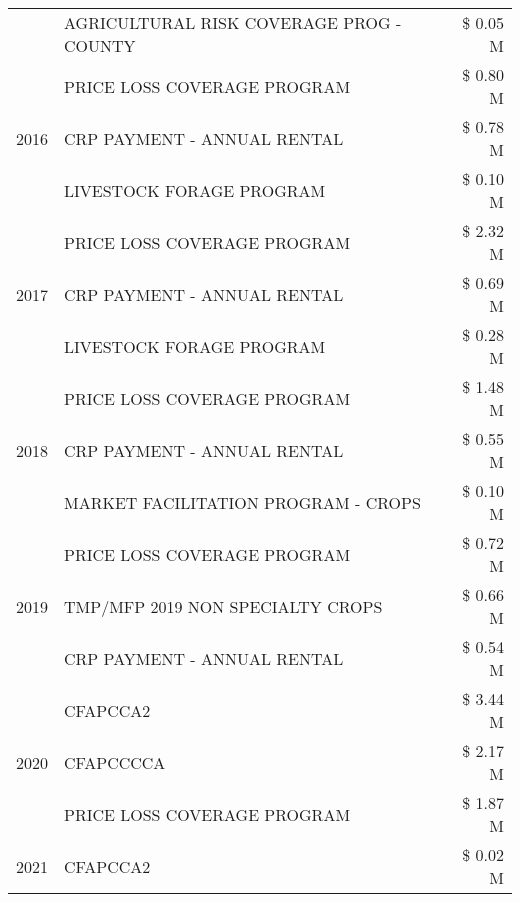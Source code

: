 \begin{tabular}{llr}
 & AGRICULTURAL RISK COVERAGE PROG - COUNTY & \$ 0.05 M \\
\cline{1-3}
\multirow[t]{3}{*}{2016} & PRICE LOSS COVERAGE PROGRAM & \$ 0.80 M \\
 & CRP PAYMENT - ANNUAL RENTAL & \$ 0.78 M \\
 & LIVESTOCK FORAGE PROGRAM & \$ 0.10 M \\
\cline{1-3}
\multirow[t]{3}{*}{2017} & PRICE LOSS COVERAGE PROGRAM & \$ 2.32 M \\
 & CRP PAYMENT - ANNUAL RENTAL & \$ 0.69 M \\
 & LIVESTOCK FORAGE PROGRAM & \$ 0.28 M \\
\cline{1-3}
\multirow[t]{3}{*}{2018} & PRICE LOSS COVERAGE PROGRAM & \$ 1.48 M \\
 & CRP PAYMENT - ANNUAL RENTAL & \$ 0.55 M \\
 & MARKET FACILITATION PROGRAM - CROPS & \$ 0.10 M \\
\cline{1-3}
\multirow[t]{3}{*}{2019} & PRICE LOSS COVERAGE PROGRAM & \$ 0.72 M \\
 & TMP/MFP 2019 NON SPECIALTY CROPS & \$ 0.66 M \\
 & CRP PAYMENT - ANNUAL RENTAL & \$ 0.54 M \\
\cline{1-3}
\multirow[t]{3}{*}{2020} & CFAPCCA2 & \$ 3.44 M \\
 & CFAPCCCCA & \$ 2.17 M \\
 & PRICE LOSS COVERAGE PROGRAM & \$ 1.87 M \\
\cline{1-3}
2021 & CFAPCCA2 & \$ 0.02 M \\
\cline{1-3}
\bottomrule
\end{tabular}
